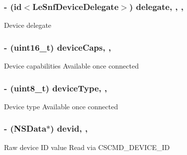 \subsubsection[{delegate}]{\setlength{\rightskip}{0pt plus 5cm}-\/ (id$<${\bf Le\+Snf\+Device\+Delegate}$>$) delegate\hspace{0.3cm}{\ttfamily [read]}, {\ttfamily [write]}, {\ttfamily [nonatomic]}, {\ttfamily [strong]}}\label{interface_le_snf_device_ab0bd07be677cb82e236c31730a4e56ae}
Device delegate \hypertarget{interface_le_snf_device_a308aab38e366fee52c6f9fbb860d2290}{}
\subsubsection[{device\+Caps}]{\setlength{\rightskip}{0pt plus 5cm}-\/ (uint16\+\_\+t) device\+Caps\hspace{0.3cm}{\ttfamily [read]}, {\ttfamily [nonatomic]}, {\ttfamily [assign]}}\label{interface_le_snf_device_a308aab38e366fee52c6f9fbb860d2290}
Device capabilities Available once connected \hypertarget{interface_le_snf_device_a6477df781a728d6f7f7e8ecdcca2205d}{}
\subsubsection[{device\+Type}]{\setlength{\rightskip}{0pt plus 5cm}-\/ (uint8\+\_\+t) device\+Type\hspace{0.3cm}{\ttfamily [read]}, {\ttfamily [nonatomic]}, {\ttfamily [assign]}}\label{interface_le_snf_device_a6477df781a728d6f7f7e8ecdcca2205d}
Device type Available once connected \hypertarget{interface_le_snf_device_a5981e716effb9c1bc130c68384065cdd}{}
\subsubsection[{devid}]{\setlength{\rightskip}{0pt plus 5cm}-\/ (N\+S\+Data$\ast$) devid\hspace{0.3cm}{\ttfamily [read]}, {\ttfamily [nonatomic]}, {\ttfamily [assign]}}\label{interface_le_snf_device_a5981e716effb9c1bc130c68384065cdd}
Raw device I\+D value Read via C\+S\+C\+M\+D\+\_\+\+D\+E\+V\+I\+C\+E\+\_\+\+I\+D \hypertarget{interface_le_snf_device_ab5b9db7753a961a6062947950e516688}{}
